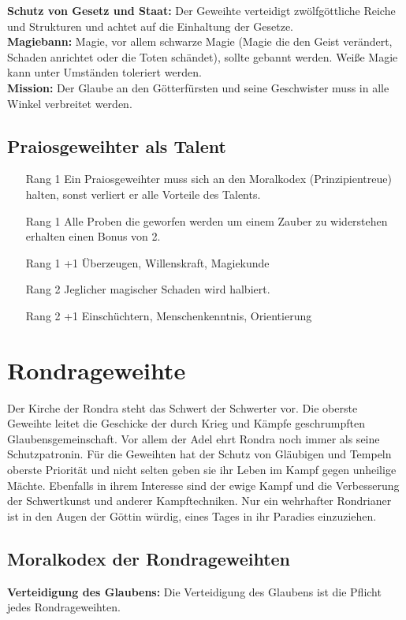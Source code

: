 \documentclass[../../Heldenanleitung2]{subfiles}
\begin{document}
\noindent
\textbf{Schutz von Gesetz und Staat:} Der Geweihte verteidigt
zwölfgöttliche Reiche und Strukturen und achtet auf
die Einhaltung der Gesetze.\\

\noindent
\textbf{Magiebann:} Magie, vor allem schwarze Magie (Magie die den Geist verändert, Schaden anrichtet oder die Toten schändet), sollte gebannt
werden. Weiße Magie kann unter Umständen toleriert
werden.\\

\noindent
\textbf{Mission:} Der Glaube an den Götterfürsten und seine Geschwister
muss in alle Winkel verbreitet werden.

\subsection{Praiosgeweihter als Talent}
\begin{itemize}
	\item[Rang 1] Ein Praiosgeweihter muss sich an den Moralkodex
(Prinzipientreue) halten, sonst verliert er alle Vorteile des Talents.
	\item[Rang 1] Alle Proben die geworfen werden um einem Zauber zu widerstehen erhalten einen Bonus von 2.
	\item[Rang 1] +1 Überzeugen, Willenskraft, Magiekunde
	\item[Rang 2] Jeglicher magischer Schaden wird halbiert.
	\item[Rang 2] +1 Einschüchtern, Menschenkenntnis, Orientierung
\end{itemize}

\section{Rondrageweihte}
Der Kirche der Rondra
steht das Schwert
der Schwerter vor. Die
oberste Geweihte leitet
die Geschicke der
durch Krieg und Kämpfe
geschrumpften Glaubensgemeinschaft.
Vor
allem der Adel ehrt Rondra
noch immer als seine
Schutzpatronin.
Für die Geweihten hat der Schutz von Gläubigen und
Tempeln oberste Priorität und nicht selten geben sie ihr
Leben im Kampf gegen unheilige Mächte.
Ebenfalls in ihrem Interesse sind der ewige Kampf
und die Verbesserung der Schwertkunst und anderer
Kampftechniken. Nur ein wehrhafter Rondrianer ist in
den Augen der Göttin würdig, eines Tages in ihr Paradies
einzuziehen.

\subsection{Moralkodex der Rondrageweihten}
\textbf{Verteidigung des Glaubens:} Die Verteidigung des
Glaubens ist die Pflicht jedes Rondrageweihten.\\
\end{document}
